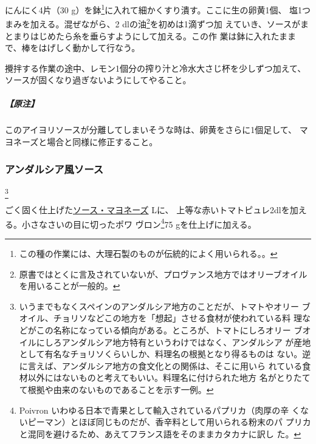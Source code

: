 \begin{recette}
にんにく4片（30 g）を鉢\footnote{この種の作業には、大理石製のものが伝統的によく用いられる。。}に入れて細かくすり潰す。ここに生の卵黄1個、
塩1つまみを加える。混ぜながら、2\undemi{} dlの油\footnote{原書ではとくに言及されていないが、プロヴァンス地方ではオリーブオイルを用いることが一般的。}を初めは1滴ずつ加
えていき、ソースがまとまりはじめたら糸を垂らすようにして加える。この作
業は鉢に入れたままで、棒をはげしく動かして行なう。

攪拌する作業の途中、レモン1個分の搾り汁と冷水大さじ\undemi{}杯を少しずつ加えて、ソースが固くなり過ぎないようにしてやること。

\hypertarget{nota-sauce-aioli}{%
\subparagraph{【原注】}\label{nota-sauce-aioli}}

このアイヨリソースが分離してしまいそうな時は、卵黄をさらに1個足して、
マヨネーズと場合と同様に修正すること。

\maeaki

\hypertarget{sauce-andalouse}{%
\subsubsection{アンダルシア風ソース}\label{sauce-andalouse}}

\footnote{いうまでもなくスペインのアンダルシア地方のことだが、トマトやオリー
  ブオイル、チョリソなどこの地方を「想起」させる食材が使われている料
  理などがこの名称になっている傾向がある。ところが、トマトにしろオリー
  ブオイルにしろアンダルシア地方特有というわけではなく、アンダルシア
  が産地として有名なチョリソくらいしか、料理名の根拠となり得るものは
  ない。逆に言えば、アンダルシア地方の食文化との関係は、そこに用いら
  れている食材以外にはないものと考えてもいい。料理名に付けられた地方
  名がとりたてて根拠や由来のないものであることを示す一例。}


ごく固く仕上げた\protect\hyperlink{mayonnaise}{ソース・マヨネーズ}\troisquarts{}
Lに、
上等な赤いトマトピュレ2\undemi{}dlを加える。小さなさいの目に切ったポワ
ヴロン\footnote{Poivron
  いわゆる日本で青果として輸入されているパプリカ（肉厚の辛
  くないピーマン）とほぼ同じものだが、香辛料として用いられる粉末のパ
  プリカと混同を避けるため、あえてフランス語をそのままカタカナに訳し
  た。}75 gを仕上げに加える。


\end{recette}
